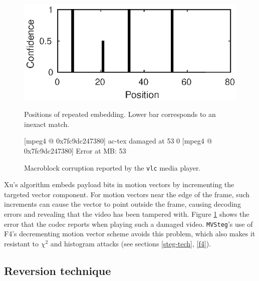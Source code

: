 \documentclass[12pt,british,twoside,notitlepage,usenames,dvipsnames,hypens,final]{report}
\numberwithin{equation}{section}
\numberwithin{figure}{section}
\renewenvironment{alltt}{\vspace{-0.6\baselineskip}\begin{oldalltt}}{\end{oldalltt}\vspace{-0.1\baselineskip}}
\begin{document}
\begin{figure}[tbh]
\centering
\begin{minipage}[t]{.45\textwidth}
  \centering
  \includegraphics[scale=0.9]{img/4xembed.eps}
  \caption{Positions of repeated embedding. Lower bar corresponds to an inexact match.}
  \label{fig:4xembed}
\end{minipage}%
\quad
\begin{minipage}[t]{.45\textwidth}
  \vspace{-5.14em}
  \begingroup
    \fontsize{11pt}{12pt}\selectfont
    \centering
    \begin{alltt}
 {\color{blue}[mpeg4 @ 0x7fc9dc247380]}
            {\color{red}ac-tex damaged at 53 0}
 {\color{blue}[mpeg4 @ 0x7fc9dc247380]}
                   {\color{red}Error at MB: 53}

    \end{alltt}
  \endgroup
  \caption{Macroblock corruption reported by the \texttt{vlc} media player.}
  \label{fig:vlc-corruption}
\end{minipage}
\end{figure}

Xu's algorithm embeds payload bits in motion vectors by incrementing the targeted vector component. For motion vectors near the edge of the frame, such increments can cause the vector to point outside the frame, causing decoding errors and revealing that the video has been tampered with. Figure \ref{fig:vlc-corruption} shows the error that the codec reports when playing such a damaged video. \texttt{MVSteg}'s use of F4's decrementing motion vector scheme avoids this problem, which also makes it resistant to $\chi^2$ and histogram attacks (see sections \ref{steg-tech}, \ref{f4}).

\subsection{Reversion technique}
\label{rev-tech}
\end{document}
